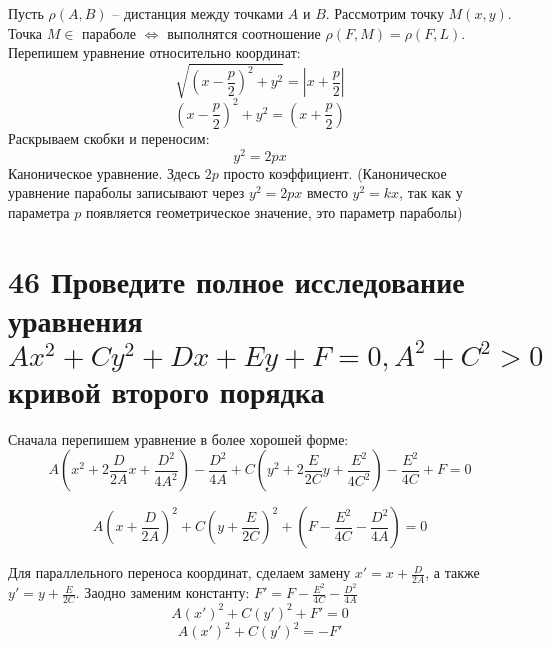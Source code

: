 \documentclass[a4paper,12pt]{article}
\begin{document}
\smallskip 

Пусть $\rho(A,B) $ – дистанция между точками $A$ и $B$. Рассмотрим точку $M(x,y)$. 
Точка $M\in$ параболе $\iff$ выполнятся соотношение
$\rho(F,M) = \rho(F,L)$. Перепишем уравнение относительно координат:
\[
\sqrt{ \left( x - \frac{p}{2} \right)^2 + y^2  } = | x + \frac{p}{2} |
\]
\[
\left( x - \frac{p}{2} \right)^2 + y^2 =  \left( x + \frac{p}{2} \right)
\]
Раскрываем скобки и переносим:
\[
y^2 = 2px
\]
Каноническое уравнение. Здесь $2p$ просто коэффициент. 
(Каноническое уравнение параболы записывают через $y^2 = 2px$ 
вместо $y^2 = kx$, так как у параметра $p$ появляется геометрическое 
значение, это параметр параболы)






\section{46 Проведите полное исследование уравнения \texorpdfstring{$ Ax^2 + Cy^2 + Dx + Ey + F = 0, A^2 + C^2 > 0$}{TEXT} кривой второго порядка}

Сначала перепишем уравнение в более хорошей форме:
\[
    A \left(  x^2 + 2\frac{D}{2A}x + \frac{D^2}{4A^2}  \right) - \frac{D^2}{4A} 
+ C \left(  y^2 + 2\frac{E}{2C}y + \frac{E^2}{4C^2}  \right) - \frac{E^2}{4C}
+ F = 0 
\]

\[
    A \left( x + \frac{D}{2A} \right) ^2 
+ C \left( y + \frac{E}{2C}  \right) ^2 
+ \left( F - \frac{E^2}{4C}  - \frac{D^2}{4A} \right) = 0
\]

Для параллельного переноса координат, сделаем замену 
$x' = x + \frac{D}{2A}$, а также 
$y' = y + \frac{E}{2C}$. 
Заодно заменим константу:
$F' = F - \frac{E^2}{4C}  - \frac{D^2}{4A}$
\[
A(x')^2 + C(y')^2 + F' = 0
\]
\[
A(x')^2 + C(y')^2 = - F'
\]
\end{document}
